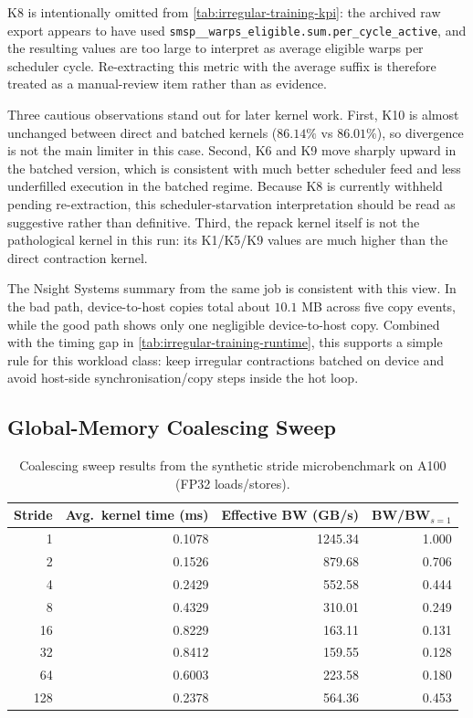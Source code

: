 K8 is intentionally omitted from \cref{tab:irregular-training-kpi}: the
archived raw export appears to have used
\texttt{smsp\_\_warps\_eligible.sum.per\_cycle\_active}, and the resulting
values are too large to interpret as average eligible warps per scheduler
cycle. Re-extracting this metric with the average suffix is therefore treated
as a manual-review item rather than as evidence.

Three cautious observations stand out for later kernel work.
First, K10 is almost unchanged between direct and batched kernels
($86.14\%$ vs $86.01\%$), so divergence is not the main limiter in this case.
Second, K6 and K9 move sharply upward in the batched version, which is
consistent with much better scheduler feed and less underfilled execution in
the batched regime. Because K8 is currently withheld pending re-extraction,
this scheduler-starvation interpretation should be read as suggestive rather
than definitive.
Third, the repack kernel itself is not the pathological kernel in this run:
its K1/K5/K9 values are much higher than the direct contraction kernel.

The Nsight Systems summary from the same job is consistent with this view.
In the bad path, device-to-host copies total about $10.1$ MB across five copy
events, while the good path shows only one negligible device-to-host copy.
Combined with the timing gap in \cref{tab:irregular-training-runtime}, this
supports a simple rule for this workload class: keep irregular contractions
batched on device and avoid host-side synchronisation/copy steps inside the
hot loop.

\subsection{Global-Memory Coalescing Sweep}

\begin{table}[t]
  \centering
  \small
  \begin{tabular}{r r r r}
    \toprule
    Stride & Avg.\ kernel time (ms) & Effective BW (GB/s) & BW/BW$_{s=1}$ \\
    \midrule
    1   & 0.1078 & 1245.34 & 1.000 \\
    2   & 0.1526 & 879.68  & 0.706 \\
    4   & 0.2429 & 552.58  & 0.444 \\
    8   & 0.4329 & 310.01  & 0.249 \\
    16  & 0.8229 & 163.11  & 0.131 \\
    32  & 0.8412 & 159.55  & 0.128 \\
    64  & 0.6003 & 223.58  & 0.180 \\
    128 & 0.2378 & 564.36  & 0.453 \\
    \bottomrule
  \end{tabular}
  \caption{Coalescing sweep results from the synthetic stride microbenchmark on
    A100 (FP32 loads/stores).}
  \label{tab:coalescing-sweep}
\end{table}

